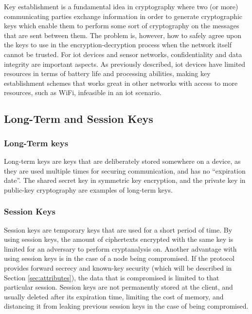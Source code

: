 Key establishment is a fundamental idea in cryptography where two (or more) communicating parties exchange information in order to generate cryptographic keys which enable them to perform some sort of cryptography on the messages that are sent between them. The problem is, however, how to safely agree upon the keys to use in the encryption-decryption process when the network itself cannot be trusted. For \gls{iot} devices and sensor networks, confidentiality and data integrity are important aspects. As previously described, \gls{iot} devices have limited resources in terms of battery life and processing abilities, making key establishment schemes that works great in other networks with access to more resources, such as WiFi, infeasible in an \gls{iot} scenario.


\subsection{Long-Term and Session Keys}


\subsubsection{Long-Term keys}

Long-term keys are keys that are deliberately stored somewhere on a device, as they are used multiple times for securing communication, and has no ``expiration date''. The shared secret key in symmetric key encryption, and the private key in public-key cryptography are examples of long-term keys.


\subsubsection{Session Keys}

Session keys are temporary keys that are used for a short period of time. By using session keys, the amount of ciphertexts encrypted with the same key is limited for an adversary to perform cryptanalysis on. Another advantage with using session keys is in the case of a node being compromised. If the protocol provides forward secrecy and known-key security (which will be described in Section \ref{sec:attributes}), the data that is compromised is limited to that particular session. Session keys are not permanently stored at the client, and usually deleted after its expiration time, limiting the cost of memory, and distancing it from leaking previous session keys in the case of being compromised.



